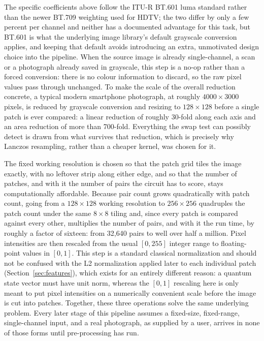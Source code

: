 \documentclass[conference]{IEEEtran}
\begin{document}
The specific coefficients above follow the ITU-R BT.601 luma standard rather than the newer BT.709 weighting used for HDTV; the two differ by only a few percent per channel and neither has a documented advantage for this task, but BT.601 is what the underlying image library's default grayscale conversion applies, and keeping that default avoids introducing an extra, unmotivated design choice into the pipeline. When the source image is already single-channel, a scan or a photograph already saved in grayscale, this step is a no-op rather than a forced conversion: there is no colour information to discard, so the raw pixel values pass through unchanged. To make the scale of the overall reduction concrete, a typical modern smartphone photograph, at roughly $4000\times3000$ pixels, is reduced by grayscale conversion and resizing to $128\times128$ before a single patch is ever compared: a linear reduction of roughly 30-fold along each axis and an area reduction of more than 700-fold. Everything the swap test can possibly detect is drawn from what survives that reduction, which is precisely why Lanczos resampling, rather than a cheaper kernel, was chosen for it.

The fixed working resolution is chosen so that the patch grid tiles the image exactly, with no leftover strip along either edge, and so that the number of patches, and with it the number of pairs the circuit has to score, stays computationally affordable. Because pair count grows quadratically with patch count, going from a $128\times128$ working resolution to $256\times256$ quadruples the patch count under the same $8\times8$ tiling and, since every patch is compared against every other, multiplies the number of pairs, and with it the run time, by roughly a factor of sixteen: from 32,640 pairs to well over half a million. Pixel intensities are then rescaled from the usual $[0,255]$ integer range to floating-point values in $[0,1]$. This step is a standard classical normalization and should not be confused with the L2 normalization applied later to each individual patch (Section~\ref{sec:features}), which exists for an entirely different reason: a quantum state vector must have unit norm, whereas the $[0,1]$ rescaling here is only meant to put pixel intensities on a numerically convenient scale before the image is cut into patches. Together, these three operations solve the same underlying problem. Every later stage of this pipeline assumes a fixed-size, fixed-range, single-channel input, and a real photograph, as supplied by a user, arrives in none of those forms until pre-processing has run.
\end{document}
